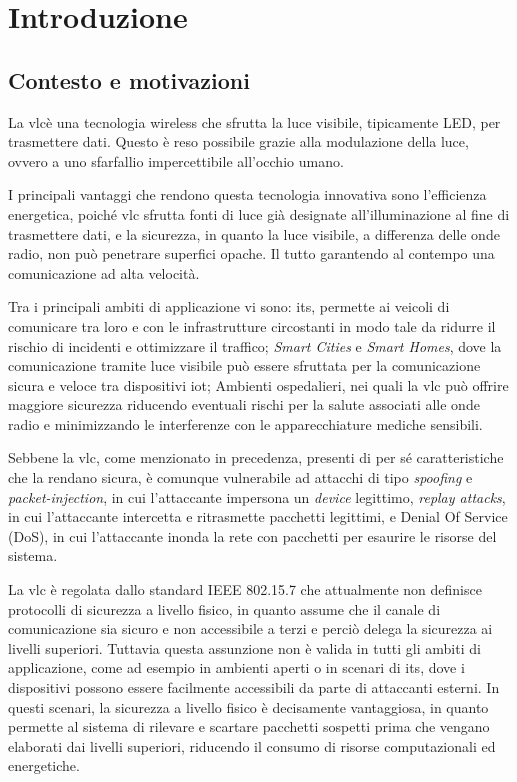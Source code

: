 \chapter{Introduzione}
\label{cap:introduzione}

\section{Contesto e motivazioni}
La \gls{vlc}\glsfirstoccur è una tecnologia wireless che sfrutta la luce visibile, tipicamente LED, per trasmettere dati. Questo è reso possibile grazie alla modulazione della luce, ovvero a uno sfarfallio impercettibile all'occhio umano.

I principali vantaggi che rendono questa tecnologia innovativa sono l'efficienza energetica, poiché \gls{vlc} sfrutta fonti di luce già designate all'illuminazione al fine di trasmettere dati, e la sicurezza, in quanto la luce visibile, a differenza delle onde radio, non può penetrare superfici opache. Il tutto garantendo al contempo una comunicazione ad alta velocità.

Tra i principali ambiti di applicazione vi sono: \gls{its}\glsfirstoccur, permette ai veicoli di comunicare tra loro e con le infrastrutture circostanti in modo tale da ridurre il rischio di incidenti e ottimizzare il traffico; \textit{Smart Cities} e \textit{Smart Homes}, dove la comunicazione tramite luce visibile può essere sfruttata per la comunicazione sicura e veloce tra dispositivi \gls{iot}\glsfirstoccur; Ambienti ospedalieri, nei quali la \gls{vlc} può offrire maggiore sicurezza riducendo eventuali rischi per la salute associati alle onde radio e minimizzando le interferenze con le apparecchiature mediche sensibili.

Sebbene la \gls{vlc}, come menzionato in precedenza, presenti di per sé caratteristiche che la rendano sicura, è comunque vulnerabile ad attacchi di tipo \textit{spoofing} e \textit{packet-injection}, in cui l'attaccante impersona un \textit{device} legittimo, \textit{replay attacks}, in cui l'attaccante intercetta e ritrasmette pacchetti legittimi, e Denial Of Service (DoS), in cui l'attaccante inonda la rete con pacchetti per esaurire le risorse del sistema.

La \gls{vlc} è regolata dallo standard IEEE 802.15.7 che attualmente non definisce protocolli di sicurezza a livello fisico, in quanto assume che il canale di comunicazione sia sicuro e non accessibile a terzi e perciò delega la sicurezza ai livelli superiori. Tuttavia questa assunzione non è valida in tutti gli ambiti di applicazione, come ad esempio in ambienti aperti o in scenari di \gls{its}, dove i dispositivi possono essere facilmente accessibili da parte di attaccanti esterni.
In questi scenari, la sicurezza a livello fisico è decisamente vantaggiosa, in quanto permette al sistema di rilevare e scartare pacchetti sospetti prima che vengano elaborati dai livelli superiori, riducendo il consumo di risorse computazionali ed energetiche.

